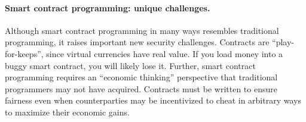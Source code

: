 \documentclass{llncs}
\newcommand{\elaine}[1]{}
\newcommand{\ignore}[1]{}
\begin{document}


\ignore{
The first part of this lab consists of step-by-step examples illustrating basic design of functional smart contracts. We highly recommend you take a hands-on approach, and interact with these smart contract examples using the Ethereum simulator! The accompanying materials to everything you need to get started with experimenting, including  a virtual machine image, basic instructions, and a language guide.

The second part of this lab focuses on designing smart contracts that achieve their intended goals, and are robust to attacks. 
Although our lab makes us of a simulator, the smart contracts you write can also be used in the live Ethereum network\footnote{At the time of this writing, the only live Ethereum network is a test network, since the main network has not yet launched.} The basic concepts we discuss apply to other cryptocurrencies as well (including Bitcoin), so most of what you learn will be transferable.
}

\paragraph{Smart contract programming: unique challenges.}
Although smart contract programming in many ways resembles 
traditional programming, 
it raises important new security challenges. 
Contracts are ``play-for-keeps'', since virtual currencies have real value. 
If you load money into a buggy smart contract, you will likely lose it. 
Further, smart contract programming requires
an ``economic thinking'' perspective that traditional
programmers may not have acquired.
Contracts must be written to ensure fairness even when
counterparties may be incentivized to cheat in arbitrary ways to maximize
their economic gains.

\end{document}
